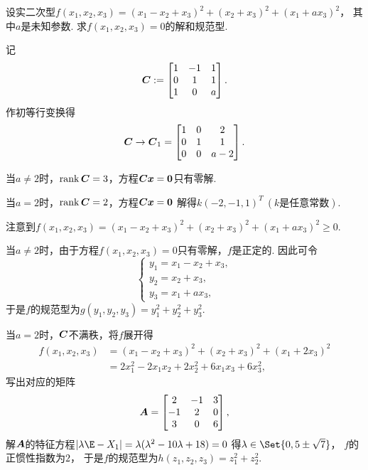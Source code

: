 \begin{example}
设实二次型\(f(x_1,x_2,x_3) = (x_1-x_2+x_3)^2 + (x_2+x_3)^2 + (x_1+ax_3)^2\)，
其中\(a\)是未知参数.
求\(f(x_1,x_2,x_3)=0\)的解和规范型.
\begin{solution}
记\[
	\boldsymbol{C} := \begin{bmatrix}
		1 & -1 & 1 \\
		0 & 1 & 1 \\
		1 & 0 & a
	\end{bmatrix}.
\]
作初等行变换得\[
	\boldsymbol{C} \to \boldsymbol{C}_1 = \begin{bmatrix}
		1 & 0 & 2 \\
		0 & 1 & 1 \\
		0 & 0 & a-2
	\end{bmatrix}.
\]

当\(a\neq2\)时，\(\rank\boldsymbol{C}=3\)，方程\(\boldsymbol{C}\boldsymbol{x}=\boldsymbol0\)只有零解.

当\(a=2\)时，\(\rank\boldsymbol{C}=2\)，方程\(\boldsymbol{C}\boldsymbol{x}=\boldsymbol0\)
解得\(k (-2,-1,1)^T\ (\text{$k$是任意常数})\).

注意到\(f(x_1,x_2,x_3) = (x_1-x_2+x_3)^2 + (x_2+x_3)^2 + (x_1+ax_3)^2 \geq 0\).

当\(a\neq2\)时，由于方程\(f(x_1,x_2,x_3)=0\)只有零解，\(f\)是正定的.
因此可令\[
	\left\{ \begin{array}{l}
		y_1 = x_1-x_2+x_3, \\
		y_2 = x_2+x_3, \\
		y_3 = x_1+ax_3,
	\end{array} \right.
\]
于是\(f\)的规范型为\(g(y_1,y_2,y_3) = y_1^2 + y_2^2 + y_3^2\).

当\(a=2\)时，\(\boldsymbol{C}\)不满秩，将\(f\)展开得\begin{align*}
	f(x_1,x_2,x_3) &= (x_1-x_2+x_3)^2 + (x_2+x_3)^2 + (x_1+2x_3)^2 \\
	&= 2 x_1^2 - 2 x_1 x_2 + 2 x_2^2 + 6 x_1 x_3 + 6 x_3^2,
\end{align*}
写出对应的矩阵\[
	\boldsymbol{A} = \begin{bmatrix}
		2 & -1 & 3 \\
		-1 & 2 & 0 \\
		3 & 0 & 6
	\end{bmatrix},
\]
解\(\boldsymbol{A}\)的特征方程\(\abs{\lambda\E-\A}=\lambda(\lambda^2-10\lambda+18)=0\)
得\(\lambda\in\Set{0,5\pm\sqrt7}\)，
\(f\)的正惯性指数为\(2\)，
于是\(f\)的规范型为\(h(z_1,z_2,z_3) = z_1^2+z_2^2\).
\end{solution}
\end{example}


